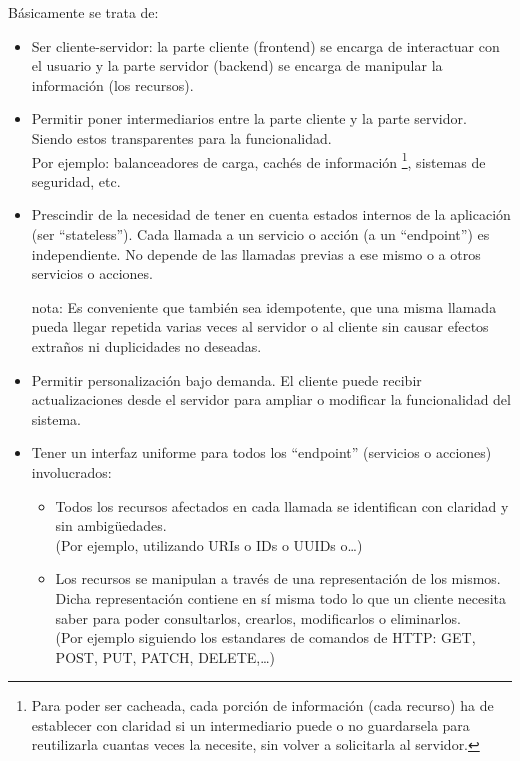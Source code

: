 \documentclass[spanish,12pt,a4paper,final,oneside]{book}
\begin{document}
Básicamente se trata de:

\begin{itemize}

\item Ser cliente-servidor: la parte cliente (frontend) se encarga de interactuar con el usuario y la parte servidor (backend) se encarga de manipular la información (los recursos).

\item Permitir poner intermediarios entre la parte cliente y la parte servidor. Siendo estos transparentes para la funcionalidad.
\\{\footnotesize Por ejemplo: balanceadores de carga, cachés de información \footnote{Para poder ser cacheada, cada porción de información (cada recurso) ha de establecer con claridad si un intermediario puede o no guardarsela para reutilizarla cuantas veces la necesite, sin volver a solicitarla al servidor.}, sistemas de seguridad, etc.}

\item Prescindir de la necesidad de tener en cuenta estados internos de la aplicación (ser ``stateless''). Cada llamada a un servicio o acción (a un ``endpoint'') es independiente. No depende de las llamadas previas a ese mismo o a otros servicios o acciones.

{\footnotesize nota: Es conveniente que también sea idempotente, que una misma llamada  pueda llegar repetida varias veces al servidor o al cliente sin causar efectos extraños ni duplicidades no deseadas.}

\item Permitir personalización bajo demanda. El cliente puede recibir actualizaciones desde el servidor para ampliar o modificar la funcionalidad del sistema.

\item Tener un interfaz uniforme para todos los ``endpoint'' (servicios o acciones) involucrados:

\begin{itemize}

\item Todos los recursos afectados en cada llamada se identifican con claridad y sin ambigüedades. 
\\{\footnotesize (Por ejemplo, utilizando URIs o IDs o UUIDs o\ldots)}

\item Los recursos se manipulan a través de una representación de los mismos. Dicha representación contiene en sí misma todo lo que un cliente necesita saber para poder consultarlos, crearlos, modificarlos o eliminarlos.
\\{\footnotesize (Por ejemplo siguiendo los estandares de comandos de HTTP: GET, POST, PUT, PATCH, DELETE,\ldots)}


\end{itemize}
\end{itemize}
\end{document}
